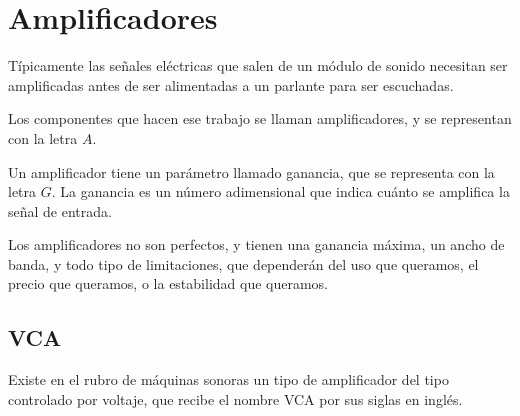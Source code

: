 \documentclass[../principal.tex]{subfiles}
\begin{document}

\chapter{Amplificadores}

Típicamente las señales eléctricas que salen de un módulo de sonido necesitan ser amplificadas antes de ser alimentadas a un parlante para ser escuchadas.

Los componentes que hacen ese trabajo se llaman amplificadores, y se representan con la letra $A$.

Un amplificador tiene un parámetro llamado ganancia, que se representa con la letra $G$. La ganancia es un número adimensional que indica cuánto se amplifica la señal de entrada.

Los amplificadores no son perfectos, y tienen una ganancia máxima, un ancho de banda, y todo tipo de limitaciones, que dependerán del uso que queramos, el precio que queramos, o la estabilidad que queramos.

\section{VCA}

Existe en el rubro de máquinas sonoras un tipo de amplificador del tipo controlado por voltaje, que recibe el nombre VCA por sus siglas en inglés.

\newpage
\end{document}
